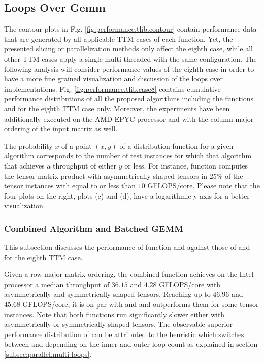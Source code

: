 \subsection{Loops Over Gemm}
\label{subsec:results.log}
The contour plots in Fig. \ref{fig:performance.tlib.contour} contain performance data that are generated by all applicable TTM cases of each  function.
Yet, the presented slicing or parallelization methods only affect the eighth case, while all other TTM cases apply a single multi-threaded  with the same configuration.
The following analysis will consider performance values of the eighth case in order to have a more fine grained visualization and discussion of the loops over  implementations.
Fig. \ref{fig:performance.tlib.case8} contains cumulative performance distributions of all the proposed algorithms including the functions  and  for the eighth TTM case only.
Moreover, the experiments have been additionally executed on the AMD EPYC processor and with the column-major ordering of the input matrix as well.

The probability $x$ of a point $(x,y)$ of a distribution function for a given algorithm corresponds to the number of test instances for which that algorithm that achieves a throughput of either $y$ or less.
For instance, function  computes the tensor-matrix product with asymmetrically shaped tensors in $25$\% of the tensor instances with equal to or less than $10$ GFLOPS/core.
Please note that the four plots on the right, plots (c) and (d), have a logarithmic y-axis for a better visualization.


\subsubsection{Combined Algorithm and Batched GEMM}
This subsection discusses the performance of function  and  against those of  and  for the eighth TTM case.

Given a row-major matrix ordering, the combined function  achieves on the Intel processor a median throughput of $36.15$ and $4.28$ GFLOPS/core with asymmetrically and symmetrically shaped tensors.
Reaching up to $46.96$ and $45.68$ GFLOPS/core, it is on par with  and  and outperforms them for some tensor instances.
Note that both functions run significantly slower either with asymmetrically or symmetrically shaped tensors.
The observable superior performance distribution of  can be attributed to the heuristic which switches between  and  depending on the inner and outer loop count as explained in section \ref{subsec:parallel.multi-loops}.

